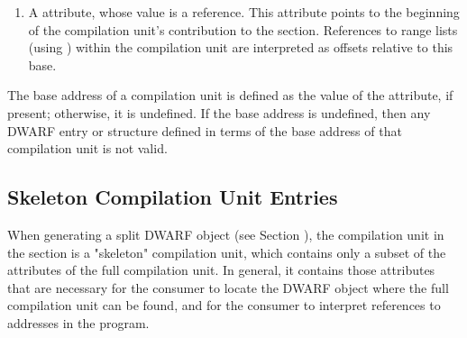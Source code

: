 \begin{enumerate}[1. ]
\item A \DWATrangesbaseNAME{}
\hypertarget{chap:DWATrangesbaseforrangelists}{}
attribute, whose value is a reference.
This attribute points to the beginning of the compilation
unit's contribution to the \dotdebugranges{} section.
References to range lists (using \DWFORMsecoffset)
within the compilation unit are
interpreted as offsets relative to this base.


\end{enumerate}

The  base address of a compilation unit is defined as the
value of the \DWATlowpc{} attribute, if present; otherwise,
it is undefined. If the base address is undefined, then any
DWARF entry or structure defined in terms of the base address
of that compilation unit is not valid.

\subsection{Skeleton Compilation Unit Entries}
\label{chap:skeletoncompilationunitentries}
When generating a split DWARF object (see 
Section ), the
compilation unit in the \dotdebuginfo{} section is a "skeleton"
compilation unit, which contains only a subset of the
attributes of the full compilation unit. In general, it
contains those attributes that are necessary for the consumer
to locate the DWARF object where the full compilation unit
can be found, and for the consumer to interpret references to
addresses in the program. 


